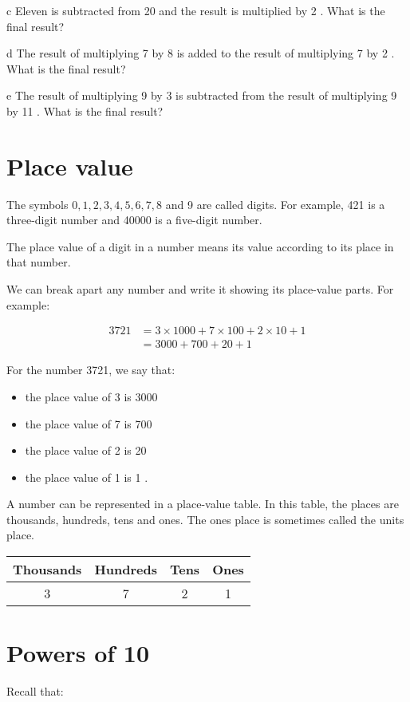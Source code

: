 \documentclass[10pt]{article}
\begin{document}
c Eleven is subtracted from 20 and the result is multiplied by 2 . What is the final result?

d The result of multiplying 7 by 8 is added to the result of multiplying 7 by 2 . What is the final result?

e The result of multiplying 9 by 3 is subtracted from the result of multiplying 9 by 11 . What is the final result?

\section*{Place value}
The symbols \(0,1,2,3,4,5,6,7,8\) and 9 are called digits. For example, 421 is a three-digit number and 40000 is a five-digit number.

The place value of a digit in a number means its value according to its place in that number.

We can break apart any number and write it showing its place-value parts. For example:

\[
\begin{aligned}
3721 & =3 \times 1000+7 \times 100+2 \times 10+1 \\
& =3000+700+20+1
\end{aligned}
\]

For the number 3721, we say that:

\begin{itemize}
  \item the place value of 3 is 3000
  \item the place value of 7 is 700
  \item the place value of 2 is 20
  \item the place value of 1 is 1 .
\end{itemize}

A number can be represented in a place-value table. In this table, the places are thousands, hundreds, tens and ones. The ones place is sometimes called the units place.

\begin{center}
\begin{tabular}{|c|c|c|c|}
\hline
Thousands & Hundreds & Tens & Ones \\
\hline
3 & 7 & 2 & 1 \\
\hline
\end{tabular}
\end{center}

\section*{Powers of 10}
Recall that:
\end{document}
